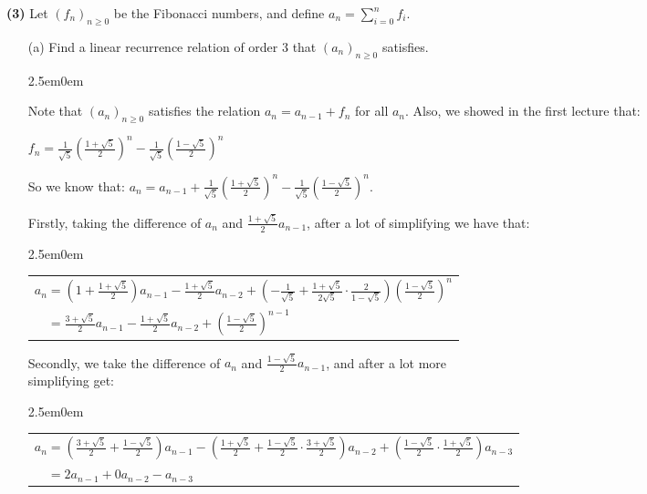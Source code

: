 \documentclass{book}
\newcommand{\exOne}{%
   \color{Purple}%
   \fontsize{13}{15}\selectfont%
}
\newcommand{\exPP}{%
   \color{RedViolet}%
   \fontsize{12}{14}\selectfont%
}
\newenvironment{myIndent}{%
   \begin{adjustwidth}{2.5em}{0em}%
}{%
   \end{adjustwidth}%
}
\newcommand{\blab}[1]{\textbf{#1}}
\newcommand{\retTwo}{\hfill\bigbreak}
\begin{document}
\blab{(3)} Let $(f_n)_{n \geq 0}$ be the Fibonacci numbers, and define $a_n = \sum\limits_{i = 0}^n f_i$.
\begin{itemize}
   \item[(a)] Find a linear recurrence relation of order $3$ that $(a_n)_{n \geq 0}$ satisfies.
   
   \begin{myIndent}\exOne
      Note that $(a_n)_{n \geq 0}$ satisfies the relation $a_n = a_{n - 1} + f_n$ for all $a_n$. Also, we showed in the first lecture that:

      {\centering $f_n = \frac{1}{\sqrt{5}}\left(\frac{1 + \sqrt{5}}{2}\right)^n - \frac{1}{\sqrt{5}}\left(\frac{1 - \sqrt{5}}{2}\right)^n $ \retTwo\par}

      So we know that: $a_n = a_{n-1} + \frac{1}{\sqrt{5}}\left(\frac{1 + \sqrt{5}}{2}\right)^n - \frac{1}{\sqrt{5}}\left(\frac{1 - \sqrt{5}}{2}\right)^n$\hspace{-0.4em}.

      Firstly, taking the difference of $a_n$ and $\frac{1 + \sqrt{5}}{2}a_{n-1}$, after a lot of simplifying we have that:
      
      \begin{myIndent}\exPP
         \begin{tabular}{l}
            $a_n = (1 + \frac{1 + \sqrt{5}}{2})a_{n-1} - \frac{1 + \sqrt{5}}{2}a_{n-2} + \left(-\frac{1}{\sqrt{5}} + \frac{1 + \sqrt{5}}{2\sqrt{5}}\cdot\frac{2}{1 - \sqrt{5}}\right)\left(\frac{1 - \sqrt{5}}{2}\right)^{n}$\\ [8pt]
            $\phantom{a_n} = \frac{3 + \sqrt{5}}{2}a_{n-1} - \frac{1 + \sqrt{5}}{2}a_{n-2} + \left(\frac{1 - \sqrt{5}}{2}\right)^{n-1}$
         \end{tabular}\newpage
      \end{myIndent}

      Secondly, we take the difference of $a_n$ and $\frac{1 - \sqrt{5}}{2}a_{n-1}$, and after a lot more\\ simplifying get:

      \begin{myIndent}\exPP
         \begin{tabular}{l}
            $a_n = \left(\frac{3 + \sqrt{5}}{2} + \frac{1-\sqrt{5}}{2}\right)a_{n-1} - \left(\frac{1 + \sqrt{5}}{2} + \frac{1-\sqrt{5}}{2}\cdot \frac{3+\sqrt{5}}{2}\right)a_{n-2} + \left(\frac{1-\sqrt{5}}{2}\cdot\frac{1 + \sqrt{5}}{2}\right)a_{n-3}$ \\ [8pt]
            $\phantom{a_n} = 2a_{n-1} + 0a_{n-2} - a_{n-3}$
         \end{tabular}\retTwo
      \end{myIndent}
   \end{myIndent}


\end{itemize}
\end{document}
